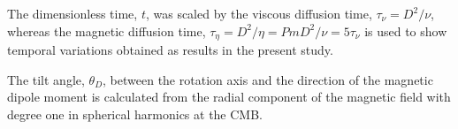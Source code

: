 The dimensionless time, $t$, was scaled by the viscous diffusion time, $\tau_\nu = D^2 / \nu$, whereas the magnetic diffusion time, $\tau_\eta = D^2 / \eta = Pm D^2 / \nu = 5 \tau_\nu$ is used to show temporal variations obtained as results in the present study.

The tilt angle, $\theta_D$, between the rotation axis and the direction of the magnetic dipole moment is calculated from the radial component of the magnetic field with degree one in spherical harmonics at the CMB.
